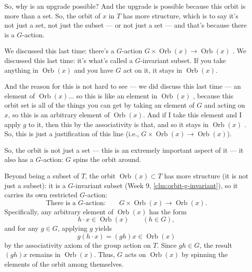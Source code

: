 \begin{speech}[00:05:39 - 00:07:16]
So, why is an upgrade possible? And the upgrade is possible because this orbit is more than a set. So, the orbit of $x$ in $T$ has more structure, which is to say it's not just a set, not just the subset --- or not just a set  --- and that's because there is a $G$-action.

We discussed this last time: there's a $G$-action $G \times \operatorname{Orb}(x) \to \operatorname{Orb}(x)$ . We discussed this last time: it's what's called a $G$-invariant subset. If you take anything in $\operatorname{Orb}(x)$ and you have $G$ act on it, it stays in $\operatorname{Orb}(x)$.

And the reason for this is not hard to see --- we did discuss this last time --- an element of $\operatorname{Orb}(x)$... so this is like an element in $\operatorname{Orb}(x)$ , because this orbit set is all of the things you can get by taking an element of $G$ and acting on $x$, so this is an arbitrary element of $\operatorname{Orb}(x)$. And if I take this element and I apply $g$ to it, then this by the associativity is that, and so it stays in $\operatorname{Orb}(x)$ . So, this is just a justification of this line (i.e., $G \times \operatorname{Orb}(x) \to \operatorname{Orb}(x)$).

So, the orbit is not just a set --- this is an extremely important aspect of it --- it also has a $G$-action: $G$ spins the orbit around.
\end{speech}

\begin{content}
Beyond being a subset of $T$, the orbit $\operatorname{Orb}(x) \subset T$ has more structure (it is not just a subset): it is a $G$-invariant subset (Week 9, \cref{clm:orbit-g-invariant}), so it carries its own restricted $G$-action:
\[
\text{There is a } G\text{-action:} \qquad G \times \operatorname{Orb}(x) \to \operatorname{Orb}(x).
\]
Specifically, any arbitrary element of $\operatorname{Orb}(x)$ has the form
\[
h \cdot x \in \operatorname{Orb}(x) \qquad (h \in G),
\]
and for any $g \in G$, applying $g$ yields
\[
g(h \cdot x) = (gh)x \in \operatorname{Orb}(x)
\]
by the associativity axiom of the group action on $T$. Since $gh \in G$, the result $(gh)x$ remains in $\operatorname{Orb}(x)$. Thus, $G$ acts on $\operatorname{Orb}(x)$ by spinning the elements of the orbit among themselves.
\end{content}

